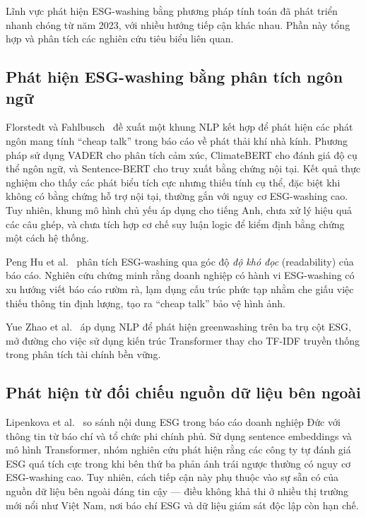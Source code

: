 Lĩnh vực phát hiện ESG-washing bằng phương pháp tính toán đã phát triển nhanh chóng từ năm 2023, với nhiều hướng tiếp cận khác nhau. Phần này tổng hợp và phân tích các nghiên cứu tiêu biểu liên quan.


\subsection{Phát hiện ESG-washing bằng phân tích ngôn ngữ}
\label{subsec:rw_linguistic}

Florstedt và Fahlbusch~\cite{florstedt2025detecting} đề xuất một khung NLP kết hợp để phát hiện các phát ngôn mang tính ``cheap talk'' trong báo cáo về phát thải khí nhà kính. Phương pháp sử dụng VADER cho phân tích cảm xúc, ClimateBERT cho đánh giá độ cụ thể ngôn ngữ, và Sentence-BERT cho truy xuất bằng chứng nội tại. Kết quả thực nghiệm cho thấy các phát biểu tích cực nhưng thiếu tính cụ thể, đặc biệt khi không có bằng chứng hỗ trợ nội tại, thường gắn với nguy cơ ESG-washing cao. Tuy nhiên, khung mô hình chủ yếu áp dụng cho tiếng Anh, chưa xử lý hiệu quả các câu ghép, và chưa tích hợp cơ chế suy luận logic để kiểm định bằng chứng một cách hệ thống.

Peng Hu et al.~\cite{su16062571} phân tích ESG-washing qua góc độ \textit{độ khó đọc} (readability) của báo cáo. Nghiên cứu chứng minh rằng doanh nghiệp có hành vi ESG-washing có xu hướng viết báo cáo rườm rà, lạm dụng cấu trúc phức tạp nhằm che giấu việc thiếu thông tin định lượng, tạo ra ``cheap talk'' bảo vệ hình ảnh.

Yue Zhao et al.~\cite{zhao2023detecting} áp dụng NLP để phát hiện greenwashing trên ba trụ cột ESG, mở đường cho việc sử dụng kiến trúc Transformer thay cho TF-IDF truyền thống trong phân tích tài chính bền vững.


\subsection{Phát hiện từ đối chiếu nguồn dữ liệu bên ngoài}
\label{subsec:rw_external}

Lipenkova et al.~\cite{lipenkova2023detecting} so sánh nội dung ESG trong báo cáo doanh nghiệp Đức với thông tin từ báo chí và tổ chức phi chính phủ. Sử dụng sentence embeddings và mô hình Transformer, nhóm nghiên cứu phát hiện rằng các công ty tự đánh giá ESG quá tích cực trong khi bên thứ ba phản ánh trái ngược thường có nguy cơ ESG-washing cao. Tuy nhiên, cách tiếp cận này phụ thuộc vào sự sẵn có của nguồn dữ liệu bên ngoài đáng tin cậy --- điều không khả thi ở nhiều thị trường mới nổi như Việt Nam, nơi báo chí ESG và dữ liệu giám sát độc lập còn hạn chế.

